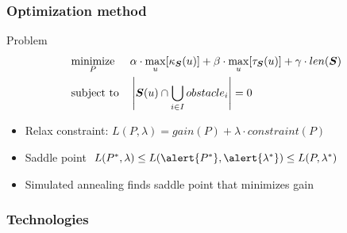 \begin{frame}
  \frametitle{Optimization method}
  \begin{block}{Problem}
    \begin{equation*}
      \begin{aligned}
        & \underset{P}{\text{minimize}}
        & & \alpha\cdot \max_u[\kappa_{\boldsymbol{S}}(u)]+\beta\cdot
        \max_u[\tau_{\boldsymbol{S}}(u)]+\gamma\cdot len(\boldsymbol{S}) \\
        & \text{subject to}
        & & \left|\boldsymbol{S}(u)\cap \bigcup_{i\in I}obstacle_i\right| = 0
      \end{aligned}
    \end{equation*}\pause
  \end{block}
  \begin{itemize}
  \item \alert{Relax} constraint: $L(P,\lambda)=gain(P)+\lambda\cdot constraint(P)$\pause
  \item \alert{Saddle} point $L(P^*,\lambda)\leq L(\alert{P^*},
    \alert{\lambda^*})\leq L(P,\lambda^*)$\pause
  \item \alert{Simulated annealing} finds saddle point that minimizes gain
  \end{itemize}
\end{frame}

\begin{frame}
  \frametitle{Technologies}
  \begin{center}
    \\[1cm]
    \\[1cm]
  \end{center}
\end{frame}

